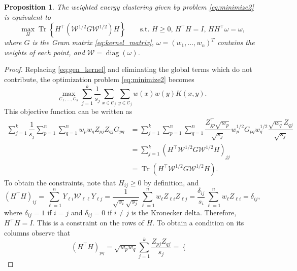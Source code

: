 \documentclass[aps,preprint,nofootinbib,floatfix]{revtex4-1}
\newtheorem{proposition}[theorem]{Proposition}
\DeclareMathOperator{\diag}{diag}
\DeclareMathOperator{\Tr}{Tr}
\newcommand\kk{K}
\newcommand\C{{\mathcal{C}}}
\newcommand\om{\omega}
\begin{document}
\begin{proposition}
\label{th:qcqp3}
The weighted energy clustering given by
problem \eqref{eq:minimize2} is equivalent to
\begin{equation}
\label{eq:qcqp3}
\max_H \Tr \left\{ H^\top (\mathcal{W}^{1/2} G \mathcal{W}^{1/2}) H  \right\}
\qquad \mbox{s.t. $H \ge 0$, $H^\top H = I$, $H H^\top \om =
\om$,}
\end{equation}
where $G$ is the Gram matrix \eqref{eq:kernel_matrix}, 
$\om = (w_1,\dotsc,w_n)^T$ contains the weights of each point, and
$\mathcal{W} = \diag(\omega)$.
\end{proposition}
\begin{proof}
Replacing \eqref{eq:gen_kernel} and eliminating the global terms which 
do not contribute, the optimization problem \eqref{eq:minimize2}
becomes 
\begin{equation}
\max_{\C_1,\dotsc,\C_k} \sum_{j=1}^k \dfrac{1}{s_j}
\sum_{x\in\C_j}\sum_{y\in\C_j} w(x)w(y) \kk(x,y) . 
\end{equation}
This 
objective function can be written as
\begin{equation}
\begin{split}
\sum_{j=1}^k \dfrac{1}{s_j} 
\sum_{p=1}^n \sum_{q=1}^n 
w_p w_q Z_{pj} Z_{qj} G_{pq} &= 
\sum_{j=1}^k 
\sum_{p=1}^n \sum_{q=1}^n 
\dfrac{Z^\top_{jp}\sqrt{w_p}}{\sqrt{s_j}} w_p^{1/2} G_{pq} w_q^{1/2} 
\dfrac{\sqrt{w_q} Z_{qj}}{\sqrt{s_j}} \\
&= 
\sum_{j=1}^k \left(H^\top \mathcal{W}^{1/2} G \mathcal{W}^{1/2} H\right)_{jj}
\\
&= \Tr\left( H^\top \mathcal{W}^{1/2} G \mathcal{W}^{1/2} H  \right).
\end{split}
\end{equation}
To obtain the constraints, note that $H_{ij} \ge 0$ by definition, and
\begin{equation}
(H^\top H)_{ij} = \sum_{\ell=1}^n 
Y_{\ell i} \mathcal{W}_{\ell \ell} Y_{\ell j } = 
\dfrac{1}{\sqrt{s_i}\sqrt{s_j}} \sum_{\ell=1}^n w_\ell Z_{\ell i} Z_{\ell j}
= \dfrac{\delta_{ij}}{s_i} \sum_{\ell=1}^n w_\ell Z_{\ell i} = \delta_{ij},
\end{equation}
where $\delta_{ij}=1$ if $i=j$ and $\delta_{ij}=0$ if $i\ne j$ is the
Kronecker delta. Therefore, $H^\top H = I$. 
This is a constraint on the rows of $H$.
To obtain a condition on its columns
observe that
\begin{equation}
\left(H^\top H\right)_{pq} = \sqrt{w_p w_q}\sum_{j=1}^k \dfrac{Z_{pj}
Z_{qj}}{s_j} = \begin{cases}

\end{cases}
\end{equation}
\end{proof}
\end{document}
